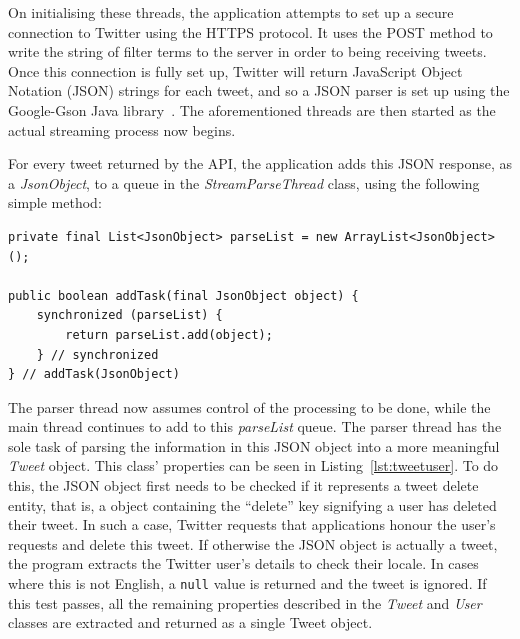 On initialising these threads, the application attempts to set up a secure connection to Twitter using the HTTPS protocol. It uses the POST method to write the string of filter terms to the server in order to being receiving tweets. Once this connection is fully set up, Twitter will return JavaScript Object Notation (JSON) strings for each tweet, and so a JSON parser is set up using the Google-Gson Java library~\cite{gson}. The aforementioned threads are then started as the actual streaming process now begins.

For every tweet returned by the API, the application adds this JSON response, as a \emph{JsonObject}, to a queue in the \emph{StreamParseThread} class, using the following simple method:
\begin{lstlisting}[caption=Adding tweets to a parse queue, label=lst:queue]
private final List<JsonObject> parseList = new ArrayList<JsonObject>();

public boolean addTask(final JsonObject object) {
    synchronized (parseList) {
        return parseList.add(object);
    } // synchronized
} // addTask(JsonObject)
\end{lstlisting}

The parser thread now assumes control of the processing to be done, while the main thread continues to add to this \emph{parseList} queue. The parser thread has the sole task of parsing the information in this JSON object into a more meaningful \emph{Tweet} object. This class' properties can be seen in Listing~\ref{lst:tweetuser}. To do this, the JSON object first needs to be checked if it represents a tweet delete entity, that is, a object containing the ``delete'' key signifying a user has deleted their tweet. In such a case, Twitter requests that applications honour the user's requests and delete this tweet. If otherwise the JSON object is actually a tweet, the program extracts the Twitter user's details to check their locale. In cases where this is not English, a \texttt{null} value is returned and the tweet is ignored. If this test passes, all the remaining properties described in the \emph{Tweet} and \emph{User} classes are extracted and returned as a single Tweet object.

